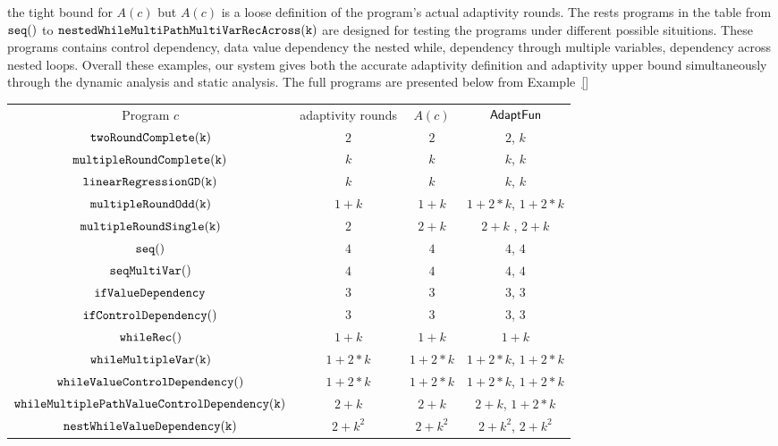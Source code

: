 the tight bound for $A(c)$ but $A(c)$ is a loose definition of the program's actual adaptivity rounds.
%
The rests programs in the table from  $\mathtt{seq()}$ to $ \mathtt{nestedWhileMultiPathMultiVarRecAcross(k)}$ are 
designed for testing the programs under different possible situitions.
These programs contains control dependency, data value dependency 
the nested while, dependency through multiple variables, dependency across nested loops. 
Overall these examples, our system gives both the accurate adaptivity definition and 
adaptivity upper bound simultaneously through the dynamic analysis and 
static analysis.
The full programs are presented below from Example~\ref{}
%
{\footnotesize
\begin{center}
        \begin{tabular}{ c c c c}
        \label{tb:imp}
         Program $c$ & adaptivity rounds & $A(c)$ & $\textsf{AdaptFun}$ \\ 
         $ \mathtt{twoRoundComplete(k)}$ & $2$ & $2$ & $2$, $k$ \\
         $ \mathtt{multipleRoundComplete(k)}$ & $k$ & $k$ & $k$, $k$  \\
         $ \mathtt{linearRegressionGD(k)}$ & $k$ & $k$ & $k$, $k$  \\
         $ \mathtt{multipleRoundOdd(k)}$ & $1 + k$ & $1 + k$ & $1 + 2*k$, $1 + 2*k$  \\
         $ \mathtt{multipleRoundSingle(k)}$ & $2$ & $2 + k$ & $2 + k$ , $2 + k$  \\
         $\mathtt{seq()}$ & $4$ & $4$ & $4$, $4$  \\ 
         $\mathtt{seqMultiVar()}$ & $4$ & $4$ & $4$, $4$ \\  
         $ \mathtt{ifValueDependency}$ & $3$ & $3$ & $3$, $3$ \\
         $\mathtt{ifControlDependency()}$ & $3$ & $3$ & $3$, $3$  \\
         $ \mathtt{whileRec()}$ & $1+k$ & $1+k$ & $1+k$  \\
         $ \mathtt{whileMultipleVar(k)}$ & $1 + 2*k$ & $1 + 2*k$ & $1 + 2*k$, $1 + 2 * k$  \\
         $ \mathtt{whileValueControlDependency()}$ & $1 + 2*k$ & $1 + 2*k$ & $1 + 2 * k$, $1 + 2 * k$  \\
         $ \mathtt{whileMultiplePathValueControlDependency(k)}$ & $2 + k$ & $2 + k$  & $2 + k$, $1 + 2 * k$   \\
         $ \mathtt{nestWhileValueDependency(k)}$ & $2 + k^2$ & $2 + k^2$  & $2 + k^2$, $2 + k^2$   \\

\end{tabular}
\end{center}}
